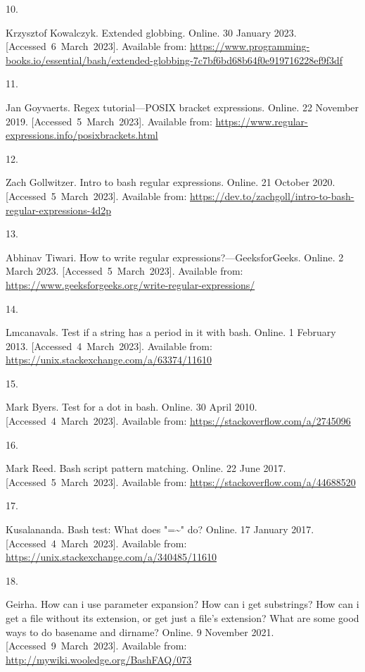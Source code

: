 \documentclass[
  a4paper,
]{article}
\newlength{\cslhangindent}
\newlength{\csllabelwidth}
\newlength{\cslentryspacingunit} %
\newenvironment{CSLReferences}[2] %
 {%
  \setlength{\parindent}{0pt}
  \ifodd #1
  \let\oldpar\par
  \def\par{\hangindent=\cslhangindent\oldpar}
  \fi
  \setlength{\parskip}{#2\cslentryspacingunit}
 }%
 {}
\newcommand{\CSLLeftMargin}[1]{\parbox[t]{\csllabelwidth}{#1}}
\newcommand{\CSLRightInline}[1]{\parbox[t]{\linewidth - \csllabelwidth}{#1}\break}
\begin{document}
\begin{CSLReferences}{0}{0}
\leavevmode{}%
\CSLLeftMargin{10. }%
\CSLRightInline{Krzysztof Kowalczyk. Extended globbing. Online. 30
January 2023. {[}Accessed~6~March~2023{]}. Available from:
\url{https://www.programming-books.io/essential/bash/extended-globbing-7c7bf6bd68b64f0e919716228ef9f3df}}

\leavevmode{}%
\CSLLeftMargin{11. }%
\CSLRightInline{Jan Goyvaerts. Regex tutorial---POSIX bracket
expressions. Online. 22 November 2019. {[}Accessed~5~March~2023{]}.
Available from:
\url{https://www.regular-expressions.info/posixbrackets.html}}

\leavevmode{}%
\CSLLeftMargin{12. }%
\CSLRightInline{Zach Gollwitzer. Intro to bash regular expressions.
Online. 21 October 2020. {[}Accessed~5~March~2023{]}. Available from:
\url{https://dev.to/zachgoll/intro-to-bash-regular-expressions-4d2p}}

\leavevmode{}%
\CSLLeftMargin{13. }%
\CSLRightInline{Abhinav Tiwari. How to write regular
expressions?---GeeksforGeeks. Online. 2 March 2023.
{[}Accessed~5~March~2023{]}. Available from:
\url{https://www.geeksforgeeks.org/write-regular-expressions/}}

\leavevmode{}%
\CSLLeftMargin{14. }%
\CSLRightInline{Lmcanavals. Test if a string has a period in it with
bash. Online. 1 February 2013. {[}Accessed~4~March~2023{]}. Available
from: \url{https://unix.stackexchange.com/a/63374/11610}}

\leavevmode{}%
\CSLLeftMargin{15. }%
\CSLRightInline{Mark Byers. Test for a dot in bash. Online. 30 April
2010. {[}Accessed~4~March~2023{]}. Available from:
\url{https://stackoverflow.com/a/2745096}}

\leavevmode{}%
\CSLLeftMargin{16. }%
\CSLRightInline{Mark Reed. Bash script pattern matching. Online. 22 June
2017. {[}Accessed~5~March~2023{]}. Available from:
\url{https://stackoverflow.com/a/44688520}}

\leavevmode{}%
\CSLLeftMargin{17. }%
\CSLRightInline{Kusalananda. Bash test: What does "=\textasciitilde" do?
Online. 17 January 2017. {[}Accessed~4~March~2023{]}. Available from:
\url{https://unix.stackexchange.com/a/340485/11610}}

\leavevmode{}%
\CSLLeftMargin{18. }%
\CSLRightInline{Geirha. How can i use parameter expansion? How can i get
substrings? How can i get a file without its extension, or get just a
file's extension? What are some good ways to do basename and dirname?
Online. 9 November 2021. {[}Accessed~9~March~2023{]}. Available from:
\url{http://mywiki.wooledge.org/BashFAQ/073}}


\end{CSLReferences}
\end{document}
